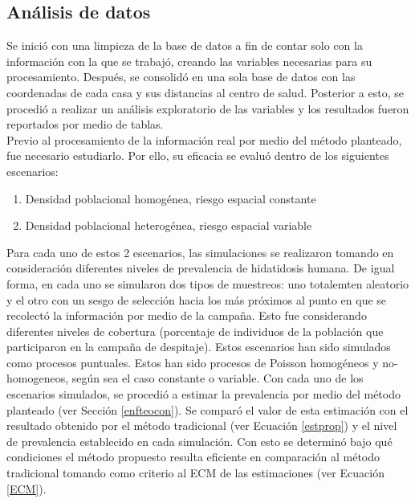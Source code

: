 \subsection{Análisis de datos}
Se inició con una limpieza de la base de datos a fin de contar solo con la información con la que se trabajó, creando las variables necesarias para su procesamiento. Después, se consolidó en una sola base de datos con las coordenadas de cada casa y sus distancias al centro de salud. %
Posterior a esto, se procedió a realizar un análisis exploratorio de las variables y los resultados fueron reportados por medio de tablas.\\
Previo al procesamiento de la información real por medio del método planteado, fue necesario estudiarlo. Por ello, su eficacia se evaluó dentro de los siguientes escenarios:
\begin{enumerate}
    \item Densidad poblacional homogénea, riesgo espacial constante
    \item Densidad poblacional heterogénea, riesgo espacial variable
\end{enumerate}
Para cada uno de estos 2 escenarios, las simulaciones se realizaron tomando en consideración diferentes niveles de prevalencia de hidatidosis humana. De igual forma, en cada uno se simularon dos tipos de muestreos: uno totalemten aleatorio y el otro con un sesgo de selección hacia los más próximos al punto en que se recolectó la información por medio de la campaña. Esto fue considerando diferentes niveles de cobertura (porcentaje de individuos de la población que participaron en la campaña de despitaje). Estos escenarios han sido simulados como procesos puntuales. Estos han sido procesos de Poisson homogéneos y no-homogeneos, según sea el caso constante o variable. Con cada uno de los escenarios simulados, se procedió a estimar la prevalencia por medio del método planteado (ver Sección \ref{enfteocon}). Se comparó el valor de esta estimación con el resultado obtenido por el método tradicional (ver Ecuación \ref{estprop}) y el nivel de prevalencia establecido en cada simulación. Con esto se determinó bajo qué condiciones el método propuesto resulta eficiente en comparación al método tradicional tomando como criterio al ECM de las estimaciones (ver Ecuación \ref{ECM}).\\
